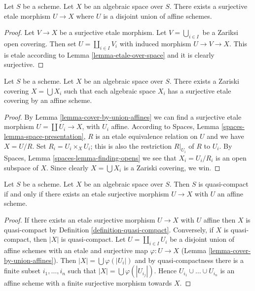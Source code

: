 \begin{lemma}
\label{lemma-cover-by-union-affines}
Let $S$ be a scheme.
Let $X$ be an algebraic space over $S$.
There exists a surjective etale morphism $U \to X$ where
$U$ is a disjoint union of affine schemes.
\end{lemma}

\begin{proof}
Let $V \to X$ be a surjective etale morphism.
Let $V = \bigcup_{i \in I}$ be a Zariksi open covering.
Then set $U = \coprod_{i \in I} V_i$ with induced morphism
$U \to V \to X$. This is etale according to
Lemma \ref{lemma-etale-over-space} and it is clearly surjective.
\end{proof}

\begin{lemma}
\label{lemma-union-of-quasi-compact}
Let $S$ be a scheme.
Let $X$ be an algebraic space over $S$.
There exists a Zariski covering $X = \bigcup X_i$
such that each algebraic space $X_i$ has a surjective
etale covering by an affine scheme.
\end{lemma}

\begin{proof}
By Lemma \ref{lemma-cover-by-union-affines} we can find a surjective
etale morphism $U = \coprod U_i \to X$, with $U_i$ affine.
According to
Spaces, Lemma \ref{spaces-lemma-space-presentation},
$R$ is an etale equivalence relation on $U$ and we have $X = U/R$. Set
$R_i = U_i \times_X U_i$; this is also the restriction $R|_{U_i}$ of $R$
to $U_i$. By
Spaces, Lemma \ref{spaces-lemma-finding-opens}
we see that $X_i = U_i/R_i$ is an open subspace of $X$. Since clearly
$X = \bigcup X_i$ is a Zariski covering, we win.
\end{proof}

\begin{lemma}
\label{lemma-quasi-compact-affine-cover}
Let $S$ be a scheme.
Let $X$ be an algebraic space over $S$.
Then $S$ is quasi-compact if and only if
there exists an etale surjective morphism $U \to X$
with $U$ an affine scheme.
\end{lemma}

\begin{proof}
If there exists an etale surjective morphism $U \to X$ with $U$
affine then $X$ is quasi-compact by Definition \ref{definition-quasi-compact}.
Conversely, if $X$ is quasi-compact, then $|X|$ is quasi-compact.
Let $U = \coprod_{i \in I} U_i$ be a disjoint union of affine schemes
with an etale and surjective map $\varphi : U \to X$
(Lemma \ref{lemma-cover-by-union-affines}).
Then $|X| = \bigcup \varphi(|U_i|)$ and
by quasi-compactness there is a finite subset $i_1, \ldots, i_n$
such that $|X| = \bigcup \varphi(|U_{i_j}|)$. Hence
$U_{i_1} \cup \ldots \cup U_{i_n}$ is an affine scheme with a 
finite surjective morphism towards $X$.
\end{proof}

